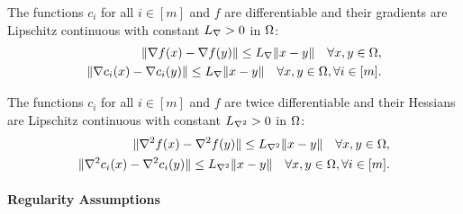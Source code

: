


\begin{assumption}
\label{lipschitz_gradients_assumption}
The functions $c_i$ for all $i \in [m]$ and $f$ are differentiable and their gradients are Lipschitz continuous with constant ${L_{\nabla}} > 0$ in $ \Omega $:
\begin{align*}
\|\nabla f(x) - \nabla f(y)\| \le {L_{\nabla}} \|x - y\| \quad \forall x,y \in \Omega, \\
\|\nabla c_i(x) - \nabla c_i(y)\| \le {L_{\nabla}} \|x - y\| \quad \forall x,y \in \Omega, \forall i \in [m].
\end{align*}
\end{assumption}


\begin{assumption}
\label{lipschitz_hessians_assumption}
The functions $c_i$ for all $i \in [m]$ and $f$ are twice differentiable and their Hessians are Lipschitz continuous with constant ${L_{\nabla^2}} > 0$ in $ \Omega $:
\begin{align*}
\|\nabla^2 f(x) - \nabla^2 f(y)\| \le {L_{\nabla^2}} \|x - y\| \quad \forall x,y \in \Omega, \\
\|\nabla^2 c_i(x) - \nabla^2 c_i(y)\| \le {L_{\nabla^2}} \|x - y\| \quad \forall x,y \in \Omega, \forall i \in [m] .
\end{align*}
\end{assumption}


\paragraph{Regularity Assumptions}

